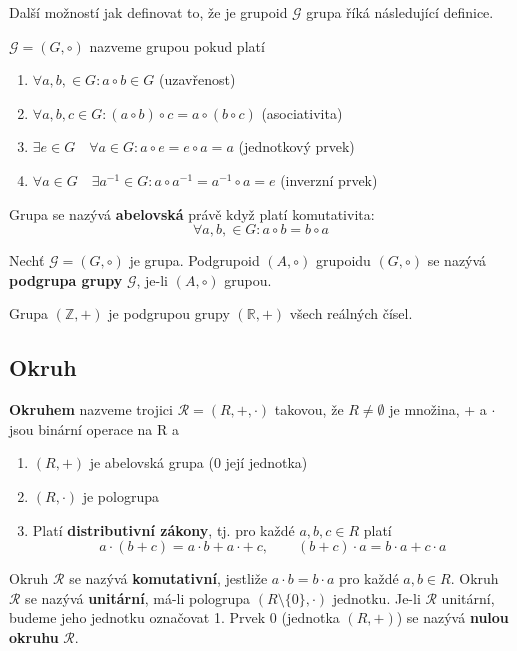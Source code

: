 Další možností jak definovat to, že je grupoid $\mathscr{G}$ grupa říká následující definice.
\begin{definition}
	 $\mathscr{G} = (G, \circ)$  nazveme grupou pokud platí
	\begin{enumerate}
		\item $\forall a,b, \in G : a \circ b \in G$ (uzavřenost)
		\item $\forall a,b,c \in G : (a \circ b) \circ c = a \circ (b \circ c)$ (asociativita)
		\item $\exists e \in G \quad \forall a \in G : a \circ e = e \circ a = a$ (jednotkový prvek)
		\item $\forall a \in G \quad \exists a^{-1} \in G : a \circ a^{-1} = a^{-1} \circ a = e$ (inverzní prvek)
	\end{enumerate}
	Grupa se nazývá \textbf{abelovská} právě když platí komutativita: $$\forall a,b, \in G : a \circ b = b \circ a$$
\end{definition}

\begin{definition}
	Nechť $\mathscr{G} = (G, \circ)$ je grupa. Podgrupoid $(A, \circ)$ grupoidu $(G, \circ)$ se nazývá \textbf{podgrupa grupy} $\mathscr{G}$, je-li $(A, \circ)$ grupou.
\end{definition}

\begin{example}
	Grupa $(\mathbb{Z}, +)$ je podgrupou grupy $(\mathbb{R}, +)$ všech reálných čísel.
\end{example}

\subsection{Okruh}
\begin{definition}
	\textbf{Okruhem} nazveme trojici $\mathscr{R} = (R, + , \cdot)$ takovou, že $R \not= \emptyset$ je množina, + a $\cdot$ jsou binární operace na R a
	\begin{enumerate}
		\item $(R, +)$ je abelovská grupa (0 její jednotka)
		\item $(R, \cdot)$ je pologrupa
		\item Platí \textbf{distributivní zákony}, tj. pro každé $a,b,c \in R$ platí $$a \cdot (b + c) = a \cdot b + a \cdot +\ c, \qquad (b + c) \cdot a = b \cdot a + c \cdot a$$
	\end{enumerate}
	Okruh $\mathscr{R}$ se nazývá \textbf{komutativní}, jestliže $ a \cdot b = b \cdot a$ pro každé $a,b \in R$. Okruh $\mathscr{R}$ se nazývá \textbf{unitární}, má-li pologrupa $(R \setminus \{0\}, \cdot)$ jednotku. Je-li $\mathscr{R}$ unitární, budeme jeho jednotku označovat 1. Prvek 0 (jednotka $(R, +)$) se nazývá \textbf{nulou okruhu} $\mathscr{R}$.
\end{definition}

